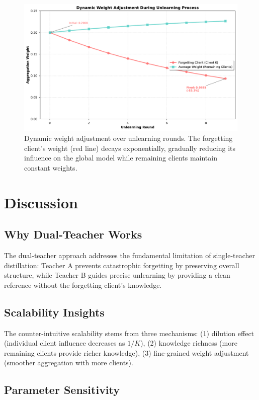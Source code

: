 \documentclass[10pt,twocolumn]{article}
\begin{document}
\begin{figure}[htbp]
\centering
\includegraphics[width=\columnwidth]{figures/figure4_dynamic_weights.pdf}
\caption{Dynamic weight adjustment over unlearning rounds. The forgetting client's weight (red line) decays exponentially, gradually reducing its influence on the global model while remaining clients maintain constant weights.}
\label{fig:weights}
\end{figure}

\section{Discussion}

\subsection{Why Dual-Teacher Works}

The dual-teacher approach addresses the fundamental limitation of single-teacher distillation: Teacher A prevents catastrophic forgetting by preserving overall structure, while Teacher B guides precise unlearning by providing a clean reference without the forgetting client's knowledge.

\subsection{Scalability Insights}

The counter-intuitive scalability stems from three mechanisms: (1) dilution effect (individual client influence decreases as $1/K$), (2) knowledge richness (more remaining clients provide richer knowledge), (3) fine-grained weight adjustment (smoother aggregation with more clients).

\subsection{Parameter Sensitivity}
\end{document}
